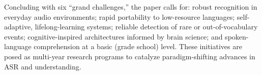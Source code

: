 Concluding with six “grand challenges,” the paper calls for: robust recognition in everyday audio environments; rapid portability to low-resource languages; self-adaptive, lifelong-learning systems; reliable detection of rare or out-of-vocabulary events; cognitive-inspired architectures informed by brain science; and spoken-language comprehension at a basic (grade school) level. These initiatives are posed as multi-year research programs to catalyze paradigm-shifting advances in ASR and understanding.
